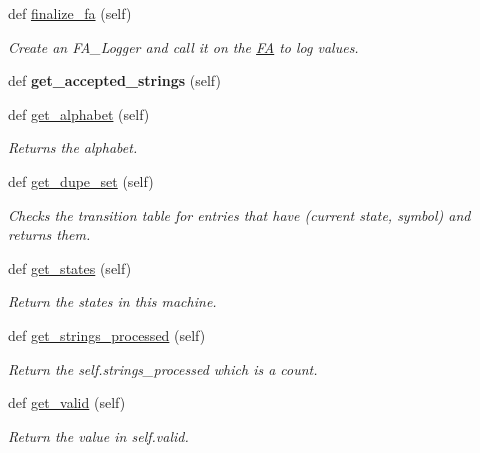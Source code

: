 \begin{DoxyCompactItemize}
def \mbox{\hyperlink{classfinite__automaton_1_1_f_a_a34e4c3a2ff6279ae393c6aa71b6a6c67}{finalize\+\_\+fa}} (self)
\begin{DoxyCompactList}\small\item\em Create an F\+A\+\_\+\+Logger and call it on the \mbox{\hyperlink{classfinite__automaton_1_1_f_a}{FA}} to log values. \end{DoxyCompactList}\item 
\mbox{\label{classfinite__automaton_1_1_f_a_a05e615cf60b67101a63f10cca4c57000}} 
def {\bfseries get\+\_\+accepted\+\_\+strings} (self)
\item 
def \mbox{\hyperlink{classfinite__automaton_1_1_f_a_a8e18faca5cb09062bcef65e75ab2ba29}{get\+\_\+alphabet}} (self)
\begin{DoxyCompactList}\small\item\em Returns the alphabet. \end{DoxyCompactList}\item 
def \mbox{\hyperlink{classfinite__automaton_1_1_f_a_a50297a5bd3019015c230357f0e48e7d8}{get\+\_\+dupe\+\_\+set}} (self)
\begin{DoxyCompactList}\small\item\em Checks the transition table for entries that have (current state, symbol) and returns them. \end{DoxyCompactList}\item 
def \mbox{\hyperlink{classfinite__automaton_1_1_f_a_ab4dea73d1d875356d9cdde9ade8dd32e}{get\+\_\+states}} (self)
\begin{DoxyCompactList}\small\item\em Return the states in this machine. \end{DoxyCompactList}\item 
def \mbox{\hyperlink{classfinite__automaton_1_1_f_a_a7e50b6bf5e22b78a0fa7a2fdfc0a41e0}{get\+\_\+strings\+\_\+processed}} (self)
\begin{DoxyCompactList}\small\item\em Return the self.\+strings\+\_\+processed which is a count. \end{DoxyCompactList}\item 
def \mbox{\hyperlink{classfinite__automaton_1_1_f_a_a127b72da4998d5bdb908e59f51c652d8}{get\+\_\+valid}} (self)
\begin{DoxyCompactList}\small\item\em Return the value in self.\+valid. \end{DoxyCompactList}\item 

\end{DoxyCompactItemize}
